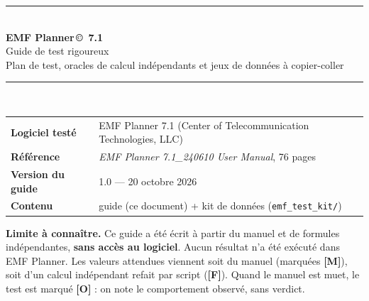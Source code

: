 \documentclass[10pt,a4paper]{article}
\newcommand{\code}[1]{\foreignlanguage{english}{\texttt{#1}}}
\begin{document}
\begin{titlepage}\thispagestyle{empty}
\vspace*{2.2cm}
{\color{accent}\rule{\textwidth}{1.2pt}}\\[6mm]
{\Huge\bfseries EMF Planner\,\copyright\ 7.1}\\[3mm]
{\LARGE Guide de test rigoureux}\\[3mm]
{\large Plan de test, oracles de calcul ind\'ependants et jeux de donn\'ees \`a copier-coller}\\[4mm]
{\color{accent}\rule{\textwidth}{1.2pt}}\\[1cm]
\begin{tabular}{@{}ll}
\textbf{Logiciel test\'e} & EMF Planner 7.1 (Center of Telecommunication Technologies, LLC)\\
\textbf{R\'ef\'erence} & \emph{EMF Planner 7.1\_240610 User Manual}, 76 pages\\
\textbf{Version du guide} & 1.0 --- 20 octobre 2026\\
\textbf{Contenu} & guide (ce document) + kit de donn\'ees (\code{emf\_test\_kit/})\\
\end{tabular}
\vfill
\begin{alerte}
\textbf{Limite \`a conna\^itre.} Ce guide a \'et\'e \'ecrit \`a partir du manuel et de formules ind\'ependantes, \textbf{sans acc\`es au logiciel}. Aucun r\'esultat n'a \'et\'e ex\'ecut\'e dans EMF Planner. Les valeurs attendues viennent soit du manuel (marqu\'ees \textbf{[M]}), soit d'un calcul ind\'ependant refait par script (\textbf{[F]}). Quand le manuel est muet, le test est marqu\'e \textbf{[O]} : on note le comportement observ\'e, sans verdict.
\end{alerte}
\end{titlepage}
\tableofcontents\newpage

\end{document}
